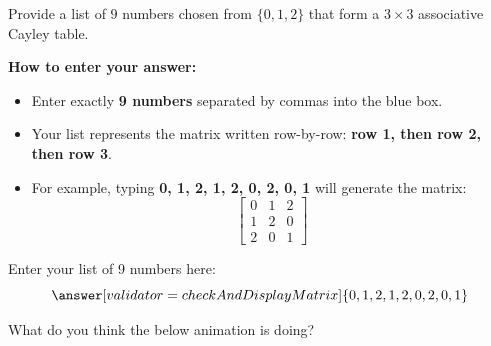 \documentclass{ximera}
\begin{document}
\begin{problem}
Provide a list of $9$ numbers chosen from $\{0, 1, 2\}$ that form a $3 \times 3$ associative Cayley table.

\bigskip
\noindent\textbf{How to enter your answer:}
\begin{itemize}
    \item Enter exactly \textbf{9 numbers} separated by commas into the blue box.
    \item Your list represents the matrix written row-by-row: \textbf{row 1, then row 2, then row 3}.
    \item For example, typing \textbf{0, 1, 2, 1, 2, 0, 2, 0, 1} will generate the matrix:
    \[
    \begin{bmatrix}
    0 & 1 & 2 \\
    1 & 2 & 0 \\
    2 & 0 & 1 
    \end{bmatrix}
    \]
\end{itemize}
\bigskip

Enter your list of 9 numbers here:
\[
\answer[validator=checkAndDisplayMatrix]{0, 1, 2, 1, 2, 0, 2, 0, 1}
\]
\end{problem}



\begin{problem}
What do you think the below animation is doing?
\end{problem}
\end{document}
